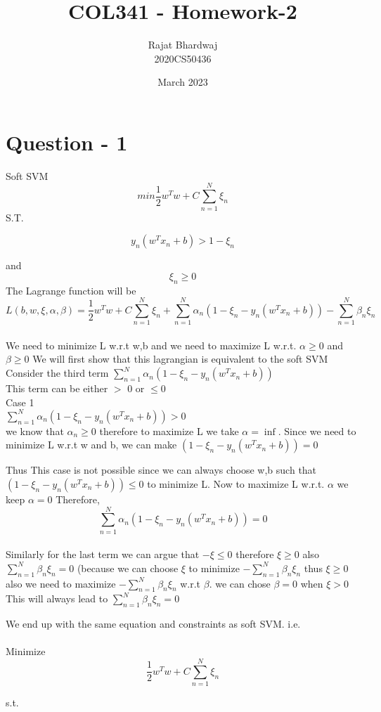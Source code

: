 \documentclass{article}
\title{COL341 - Homework-2}
\author{Rajat Bhardwaj\\2020CS50436}
\date{March 2023}
\begin{document}
\maketitle

\section{Question - 1 }

Soft SVM
$$min\frac{1}{2}w^Tw+C\sum_{n = 1}^{N}\xi_n$$
S.T.

$$y_n(w^Tx_n+b)>1- \xi_n  $$

and
$$\xi_n \ge 0 $$
The Lagrange function will be 
$$L(b , w , \xi , \alpha , \beta) = \frac{1}{2}w^Tw+ C\sum_{n = 1}^{N}\xi_n+\sum_{n=1}^{N}\alpha_n(1 - \xi_n -y_n(w^Tx_n+b)) - \sum_{n = 1}^{N}\beta_n\xi_n$$
\\
We need to minimize L w.r.t w,b and we need to maximize L w.r.t. $\alpha \ge 0 $ and $\beta \ge 0$ 
We will first show that this lagrangian is equivalent to the soft SVM \\
Consider the third term $\sum_{n=1}^{N}\alpha_n(1 - \xi_n -y_n(w^Tx_n+b))$ \\
This term can be either $>$ 0 or $\le 0$\\
Case 1\\
$\sum_{n=1}^{N}\alpha_n(1 - \xi_n -y_n(w^Tx_n+b)) > 0$ \\
we know that $\alpha_n \ge 0$ therefore to maximize L we take $\alpha = \inf$. Since we need to minimize L w.r.t w and b, we can make $(1 - \xi_n -y_n(w^Tx_n+b)) = 0$ 

Thus This case is not possible since we can always choose w,b such that $(1 - \xi_n -y_n(w^Tx_n+b)) \le 0$ to minimize L. Now to maximize L w.r.t. $\alpha$ we keep $\alpha =0$   
Therefore,
$$\sum_{n=1}^{N}\alpha_n(1 - \xi_n -y_n(w^Tx_n+b)) = 0 $$
\\
Similarly for the last term we can argue that $-\xi \le 0$ therefore $\xi \ge 0$ also $\sum_{n = 1}^{N}\beta_n\xi_n = 0$
(because we can choose $\xi$ to minimize $-\sum_{n = 1}^{N}\beta_n\xi_n$ thus $\xi \ge 0$ also we need to maximize $-\sum_{n = 1}^{N}\beta_n\xi_n$  w.r.t $\beta$. we can chose $\beta = 0$ when $\xi > 0$ This will always lead to $\sum_{n = 1}^{N}\beta_n\xi_n = 0$

We end up with the same equation and constraints as soft SVM. i.e.\\
\\
Minimize $$\frac{1}{2}w^Tw+C\sum_{n = 1}^{N}\xi_n$$

s.t. 
\end{document}
